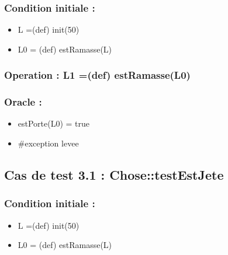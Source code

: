 \documentclass[11pt]{article}
\begin{document}
\subsubsection{Condition initiale :}
\label{sec-1.4.1}

\begin{itemize}

\item L =(def) init(50)\\
\label{sec-1.4.1.1}


\item L0 = (def) estRamasse(L)\\
\label{sec-1.4.1.2}

\end{itemize} %
\subsubsection{Operation : L1 =(def) estRamasse(L0)}
\label{sec-1.4.2}

\subsubsection{Oracle :}
\label{sec-1.4.3}

\begin{itemize}

\item estPorte(L0) = true\\
\label{sec-1.4.3.1}


\item \#exception levee\\
\label{sec-1.4.3.2}



\end{itemize} %
\subsection{Cas de test 3.1 : Chose::testEstJete}
\label{sec-1.5}

\subsubsection{Condition initiale :}
\label{sec-1.5.1}

\begin{itemize}

\item L =(def) init(50)\\
\label{sec-1.5.1.1}


\item L0 = (def) estRamasse(L)\\
\label{sec-1.5.1.2}

\end{itemize} %
\end{document}

